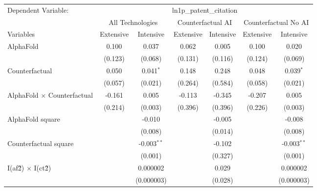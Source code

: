\begingroup
\centering
\begin{tabular}{lcccccc}
   \tabularnewline \midrule \midrule
   Dependent Variable: & \multicolumn{6}{c}{ln1p\_patent\_citation}\\
 & \multicolumn{2}{c}{All Technologies} & \multicolumn{2}{c}{Counterfactual AI} & \multicolumn{2}{c}{Counterfactual No AI} \\
\cmidrule(lr){1-1}\cmidrule(lr){2-3} \cmidrule(lr){4-5} \cmidrule(lr){6-7}
Variables & \multicolumn{1}{c}{Extensive} & \multicolumn{1}{c}{Intensive} & \multicolumn{1}{c}{Extensive} & \multicolumn{1}{c}{Intensive} & \multicolumn{1}{c}{Extensive} & \multicolumn{1}{c}{Intensive} \\
\cmidrule(lr){1-1}\cmidrule(lr){2-2} \cmidrule(lr){3-3} \cmidrule(lr){4-4} \cmidrule(lr){5-5} \cmidrule(lr){6-6} \cmidrule(lr){7-7}
   AlphaFold                          & 0.100   & 0.037         & 0.062   & 0.005   & 0.100   & 0.020\\   
                                      & (0.123) & (0.068)       & (0.131) & (0.116) & (0.124) & (0.069)\\   
   Counterfactual                     & 0.050   & 0.041$^{*}$   & 0.148   & 0.248   & 0.048   & 0.039$^{*}$\\   
                                      & (0.057) & (0.021)       & (0.264) & (0.584) & (0.058) & (0.021)\\   
   AlphaFold $\times$ Counterfactual  & -0.161  & 0.005         & -0.113  & -0.345  & -0.207  & 0.005\\   
                                      & (0.214) & (0.003)       & (0.396) & (0.396) & (0.226) & (0.003)\\   
   AlphaFold square                   &         & -0.010        &         & -0.005  &         & -0.008\\   
                                      &         & (0.008)       &         & (0.014) &         & (0.008)\\   
   Counterfactual square              &         & -0.003$^{**}$ &         & -0.102  &         & -0.003$^{**}$\\   
                                      &         & (0.001)       &         & (0.327) &         & (0.001)\\   
   I(af\^2) $\times$ I(ct\^2)         &         & 0.000002      &         & 0.029   &         & 0.000002\\   
                                      &         & (0.000003)    &         & (0.028) &         & (0.000003)\\   

\end{tabular}

